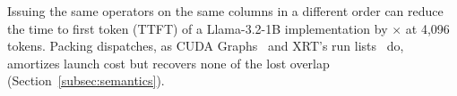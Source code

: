 Issuing the same operators on the same columns in a different order can reduce the time to first token (TTFT) of a Llama-3.2-1B implementation by \FigOneGain$\times$ at 4{,}096 tokens.
Packing dispatches, as CUDA Graphs~\citep{nvidia-cudagraphs} and XRT's run lists~\citep{xrt-repo} do, amortizes launch cost but recovers none of the lost overlap (Section~\ref{subsec:semantics}).


